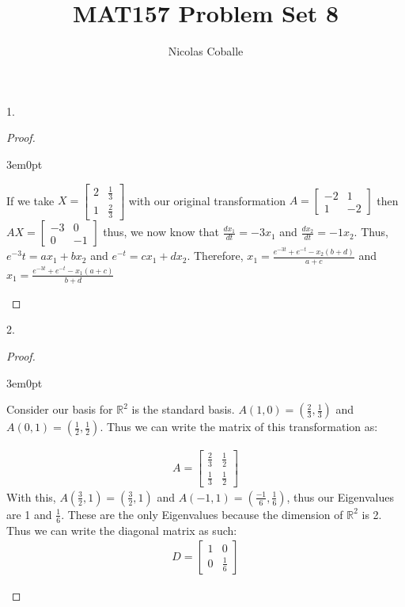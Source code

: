 \documentclass[11pt]{article}
\title{MAT157 Problem Set 8}
\author{Nicolas Coballe}
\newcommand{\R}{\mathbb{R}}
\newenvironment{myproof}
{\begin{proof} \begin{adjustwidth}{3em}{0pt}$ $\par\nobreak\ignorespaces}
{\end{adjustwidth} \end{proof}}
\begin{document}
\maketitle
\begin{flushleft}

1.

\begin{myproof}

If we take $X = \begin{bmatrix}
2 & \frac{1}{3} \\
1 & \frac{2}{3}
\end{bmatrix}$ with our original transformation $A = \begin{bmatrix}
-2 & 1 \\
1 & -2
\end{bmatrix}$ then $AX = \begin{bmatrix}
-3 & 0 \\
0 & -1
\end{bmatrix}$ thus, we now know that $\frac{dx_1}{dt} = -3x_1$ and $\frac{dx_2}{dt} = -1x_2$. Thus, $e^{-3}t = ax_1 + bx_2$ and $e^{-t}=cx_1 + dx_2$. Therefore, $x_1 = \frac{e^{-3t}+e^{-t}-x_2(b+d)}{a+c}$ and $x_1 = \frac{e^{-3t}+e^{-t}-x_1(a+c)}{b+d}$

\end{myproof}

\newpage

2.

\begin{myproof}

Consider our basis for $\R^2$ is the standard basis. $A(1,0) = (\frac{2}{3},\frac{1}{3})$ and $A(0,1) = (\frac{1}{2},\frac{1}{2})$. Thus we can write the matrix of this transformation as:

\begin{align*}
A=
\begin{bmatrix}
\frac{2}{3} & \frac{1}{2} \\
\frac{1}{3} & \frac{1}{2}
\end{bmatrix}
\end{align*}
With this, $A(\frac{3}{2},1) = (\frac{3}{2},1)$ and $A(-1,1) = (\frac{-1}{6},\frac{1}{6})$, thus our Eigenvalues are 1 and $\frac{1}{6}$. These are the only Eigenvalues because the dimension of $\R^2$ is 2. Thus we can write the diagonal matrix as such:
\begin{align*}
D=
\begin{bmatrix}
1 & 0 \\
0 & \frac{1}{6}
\end{bmatrix}
\end{align*}


\end{myproof}
\end{flushleft}
\end{document}
